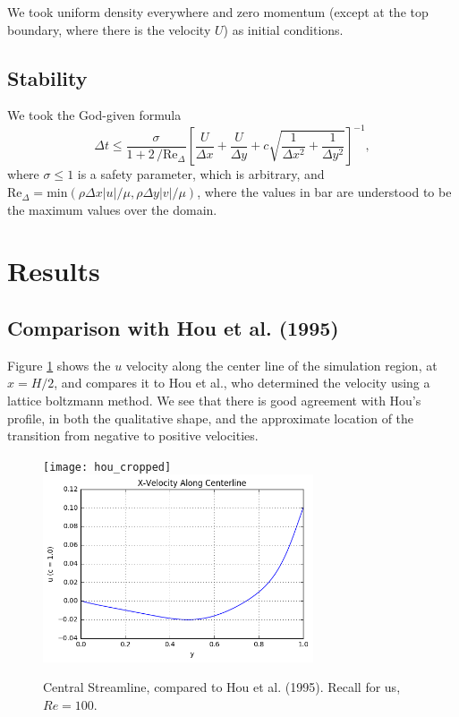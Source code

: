 \documentclass[11pt]{article}
\newcommand{\Rey}{\text{Re}}
\begin{document}
We took uniform density everywhere and zero momentum (except at the top boundary, where there is the velocity $U$) as initial conditions.

\subsection{Stability}

We took the God-given formula
\begin{equation}
 \Delta t \leq \frac{\sigma}{1 + 2\,/\Rey_\Delta}\left[ \frac{U}{\Delta x} + \frac{U}{\Delta y} + c\sqrt{\frac{1}{\Delta x^2} + \frac{1}{\Delta y^2}} \right]^{-1},
\end{equation}
where $\sigma \leq 1$ is a safety parameter, which is arbitrary, and $\Rey_\Delta = \text{min}(\rho\Delta x|u|/\mu, \rho\Delta y|v|/\mu)$, where the values in bar are understood to be
the maximum values over the domain.


\section{Results}

\subsection{Comparison with Hou et al. (1995)}

Figure \ref{Central Profile} shows the $u$ velocity along the center line of the simulation region, at $x=H/2$, and compares it to Hou et al., who determined the velocity using a lattice boltzmann method.  We see that there is good agreement with Hou's profile, in both the qualitative shape, and the approximate location of the transition from negative to positive velocities.

\begin{center}
\begin{figure}[ht!]
\begin{minipage}{16cm}\label{Central Profile}
\texttt{[image: hou\_cropped]}\includegraphics[width=8cm]{u_profile}
\end{minipage}
\caption{Central Streamline, compared to Hou et al. (1995).  Recall for us, $Re=100$.}
\end{figure}
\end{center}
\end{document}
